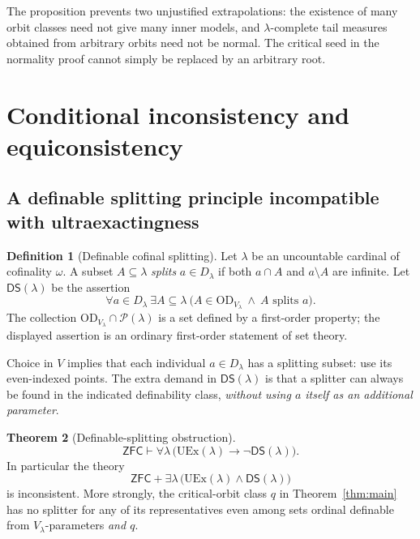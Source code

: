 \documentclass[11pt,letterpaper]{article}
\theoremstyle{definition}
\newtheorem{definition}{Definition}[section]
\newtheorem{theorem}[definition]{Theorem}
\newcommand{\ZFC}{\mathsf{ZFC}}
\newcommand{\OD}{\mathrm{OD}}
\newcommand{\UEx}{\mathrm{UEx}}
\newcommand{\Pow}{\mathcal P}
\begin{document}
The proposition prevents two unjustified extrapolations: the existence of many orbit classes need not give many inner models, and $\lambda$-complete tail measures obtained from arbitrary orbits need not be normal. The critical seed in the normality proof cannot simply be replaced by an arbitrary root.

\section{Conditional inconsistency and equiconsistency}\label{sec:consistency}

\subsection{A definable splitting principle incompatible with ultraexactingness}

\begin{definition}[Definable cofinal splitting]\label{def:splitting}
Let $\lambda$ be an uncountable cardinal of cofinality $\omega$. A subset $A\subseteq\lambda$ \emph{splits} $a\in D_\lambda$ if both $a\cap A$ and $a\setminus A$ are infinite. Let $\mathsf{DS}(\lambda)$ be the assertion
\[
 \forall a\in D_\lambda\ \exists A\subseteq\lambda\
 \bigl(A\in\OD_{V_\lambda}\ \wedge\ A\text{ splits }a\bigr).
\]
The collection $\OD_{V_\lambda}\cap\Pow(\lambda)$ is a set defined by a first-order property; the displayed assertion is an ordinary first-order statement of set theory.
\end{definition}

Choice in $V$ implies that each individual $a\in D_\lambda$ has a splitting subset: use its even-indexed points. The extra demand in $\mathsf{DS}(\lambda)$ is that a splitter can always be found in the indicated definability class, \emph{without using $a$ itself as an additional parameter}.

\begin{theorem}[Definable-splitting obstruction]\label{thm:splitting}
\[
          \ZFC\vdash\forall\lambda\,
                    \bigl(\UEx(\lambda)\longrightarrow\neg\mathsf{DS}(\lambda)\bigr).
\]
In particular the theory
\[
        \ZFC+\exists\lambda\,
             \bigl(\UEx(\lambda)\wedge\mathsf{DS}(\lambda)\bigr)
\]
is inconsistent. More strongly, the critical-orbit class $q$ in Theorem~\ref{thm:main} has no splitter for any of its representatives even among sets ordinal definable from $V_\lambda$-parameters \emph{and $q$}.
\end{theorem}
\end{document}
